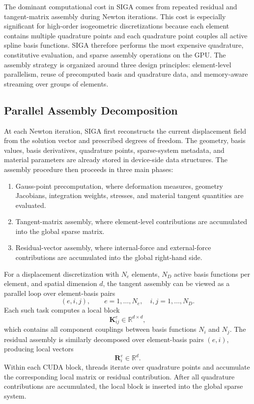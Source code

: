 \documentclass[11pt]{article}
\begin{document}
The dominant computational cost in SIGA comes from repeated residual and tangent-matrix assembly during Newton iterations. This cost is especially significant for high-order isogeometric discretizations because each element contains multiple quadrature points and each quadrature point couples all active spline basis functions. SIGA therefore performs the most expensive quadrature, constitutive evaluation, and sparse assembly operations on the GPU. The assembly strategy is organized around three design principles: element-level parallelism, reuse of precomputed basis and quadrature data, and memory-aware streaming over groups of elements.

\subsection{Parallel Assembly Decomposition}

At each Newton iteration, SIGA first reconstructs the current displacement field from the solution vector and prescribed degrees of freedom. The geometry, basis values, basis derivatives, quadrature points, sparse-system metadata, and material parameters are already stored in device-side data structures. The assembly procedure then proceeds in three main phases:
\begin{enumerate}
    \item Gauss-point precomputation, where deformation measures, geometry Jacobians, integration weights, stresses, and material tangent quantities are evaluated.
    \item Tangent-matrix assembly, where element-level contributions are accumulated into the global sparse matrix.
    \item Residual-vector assembly, where internal-force and external-force contributions are accumulated into the global right-hand side.
\end{enumerate}

For a displacement discretization with \(N_e\) elements, \(N_D\) active basis functions per element, and spatial dimension \(d\), the tangent assembly can be viewed as a parallel loop over element-basis pairs
\[
    (e,i,j), \qquad
    e = 1,\ldots,N_e, \quad
    i,j = 1,\ldots,N_D .
\]
Each such task computes a local block
\[
    \mathbf{K}^{e}_{ij} \in \mathbb{R}^{d \times d},
\]
which contains all component couplings between basis functions \(N_i\) and \(N_j\). The residual assembly is similarly decomposed over element-basis pairs \((e,i)\), producing local vectors
\[
    \mathbf{R}^{e}_{i} \in \mathbb{R}^{d}.
\]
Within each CUDA block, threads iterate over quadrature points and accumulate the corresponding local matrix or residual contribution. After all quadrature contributions are accumulated, the local block is inserted into the global sparse system.
\end{document}

